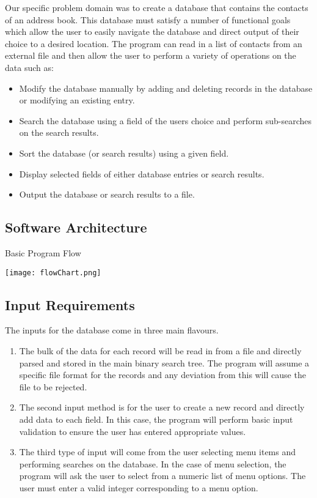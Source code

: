 \documentclass[11pt]{article}
\begin{document}
	Our specific problem domain was to create a database that contains the contacts of an address book. This database must
satisfy a number of functional goals which allow the user to easily navigate the database and direct output of their choice
to a desired location. The program can read in a list of contacts from an external file and then allow the user to perform a variety of operations on the data such as: 
\begin{itemize}
	\item Modify the database manually by adding and deleting records in the database or modifying an existing entry.
	\item Search the database using a field of the users choice and perform sub-searches on the search results.
	\item Sort the database (or search results) using a given field.
	\item Display selected fields of either database entries or search results.
	\item Output the database or search results to a file.
\end{itemize}
\newpage
\subsection*{Software Architecture}
\vspace{1cm}
Basic Program Flow	
	
\texttt{[image: flowChart.png]}


\subsection*{Input Requirements}

	The inputs for the database come in three main flavours. 

	\begin{enumerate}
		\item The bulk of the data for each record will be read in from a file and directly parsed and stored in the main
		      binary search tree. The program will assume a specific file format for the records and any deviation from
		      this will cause the file to be rejected.
		
		\item The second input method is for the user to create a new record and directly add data to each field. In this
		   	  case, the program will perform basic input validation to ensure the user has entered appropriate values. 

		\item The third type of input will come from the user selecting menu items and performing searches on the database.
		  	  In the case of menu selection, the program will ask the user to select from a numeric list of menu options. 
		  	  The user must enter a valid integer corresponding to a menu option.	
		
	\end{enumerate}		
	
\end{document}
